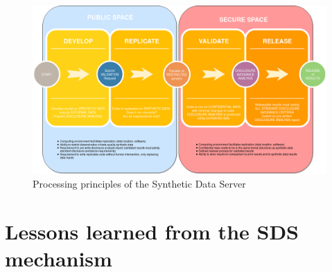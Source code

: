 \documentclass{article}
\begin{document}
\begin{figure}
    \centering
    \includegraphics[width=\textwidth]{figs/SyntheticDataCycle.png}
    \caption{Processing principles of the Synthetic Data Server}
    \label{fig:data-cycle.png}
\end{figure}


\restoregeometry
{}


\section{Lessons learned from the SDS mechanism}
\end{document}
